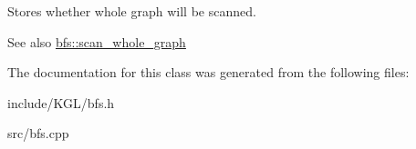 Stores whether whole graph will be scanned. 

\begin{DoxySeeAlso}{See also}
\mbox{\hyperlink{classbfs_a25fc51b1bfbbdd3afefe0a84c1bd2f6b}{bfs\+::scan\+\_\+whole\+\_\+graph}} 
\end{DoxySeeAlso}


The documentation for this class was generated from the following files\+:\begin{DoxyCompactItemize}
\item 
include/\+K\+G\+L/bfs.\+h\item 
src/bfs.\+cpp\end{DoxyCompactItemize}
